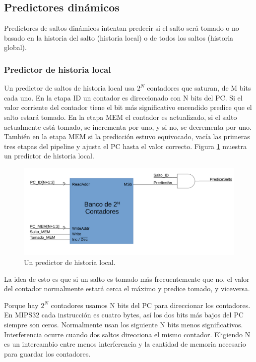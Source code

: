 \documentclass[a4paper]{article}
\begin{document}
\subsection{Predictores dinámicos}

Predictores de saltos dinámicos intentan predecir si el salto será tomado o no basado en la historia del salto (historia local) o de todos los saltos (historia global).

\subsubsection{Predictor de historia local}

Un predictor de saltos de historia local usa $2^N$ contadores que saturan, de M bits cada uno. En la etapa ID un contador es direccionado con N bits del PC. Si el valor corriente del contador tiene el bit más significativo encendido predice que el salto estará tomado. En la etapa MEM el contador es actualizado, si el salto actualmente está tomado, se incrementa por uno, y si no, se decrementa por uno. También en la etapa MEM si la predicción estuvo equivocado, vacía las primeras tres etapas del pipeline y ajusta el PC hasta el valor correcto. Figura \ref{fig:local_history} muestra un predictor de historia local.

\begin{figure}[!htb]
\centering
\includegraphics[scale=0.4]{./img/local_history}
\caption{Un predictor de historia local.}
\label{fig:local_history}
\end{figure}

La idea de esto es que si un salto es tomado más frecuentemente que no, el valor del contador normalmente estará cerca el máximo y predice tomado, y viceversa.

Porque hay $2^N$ contadores usamos N bits del PC para direccionar los contadores. En MIPS32 cada instrucción es cuatro bytes, así los dos bits más bajos del PC siempre son ceros. Normalmente usan los siguiente N bits menos significativos. Interferencia ocurre cuando dos saltos direcciona el mismo contador. Eligiendo N es un intercambio entre menos interferencia y la cantidad de memoria necesario para guardar los contadores.
\end{document}
